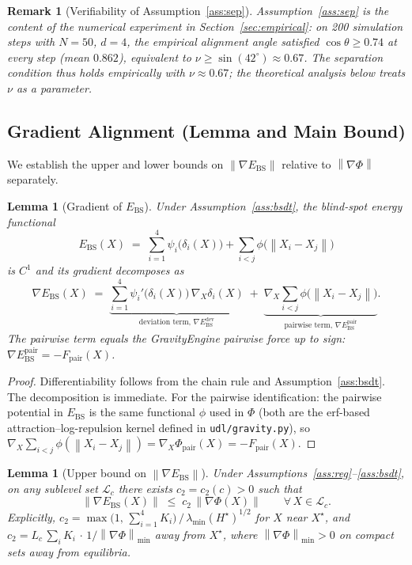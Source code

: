 \documentclass[11pt]{article}
\newtheorem{lemma}[theorem]{Lemma}
\newtheorem{remark}[theorem]{Remark}
\theoremstyle{definition}
\newcommand{\Xst}{X^{\star}}
\newcommand{\grad}{\nabla}
\newcommand{\Ebs}{E_{\mathrm{BS}}}
\newcommand{\lmin}{\lambda_{\min}}
\newcommand{\norm}[1]{\left\|#1\right\|}
\newcommand{\costheta}{\cos\theta}
\begin{document}
\begin{remark}[Verifiability of Assumption~\ref{ass:sep}]
\label{rem:verifiable}
Assumption~\ref{ass:sep} is the content of the numerical experiment in
Section~\ref{sec:empirical}: on 200 simulation steps with $N=50$, $d=4$,
the empirical alignment angle satisfied $\costheta \ge 0.74$ at every step
(mean $0.862$), equivalent to $\nu \ge \sin(42^\circ) \approx 0.67$.  The
separation condition thus holds empirically with $\nu \approx 0.67$;
the theoretical analysis below treats $\nu$ as a parameter.
\end{remark}

\subsection{Gradient Alignment (Lemma and Main Bound)}
\label{sec:equiv:gradient}

We establish the upper and lower bounds on $\norm{\grad\Ebs}$ relative to
$\norm{\grad\Phi}$ separately.

\begin{lemma}[Gradient of $\Ebs$]
\label{lem:grad_ebs}
Under Assumption~\ref{ass:bsdt}, the blind-spot energy functional
\[
  \Ebs(X) \;=\; \sum_{i=1}^{4}\psi_i\bigl(\delta_i(X)\bigr)
              + \sum_{i < j}\phi\bigl(\norm{X_i - X_j}\bigr)
\]
is $C^1$ and its gradient decomposes as
\[
  \grad\Ebs(X)
  \;=\;
  \underbrace{\sum_{i=1}^{4}\psi_i'\bigl(\delta_i(X)\bigr)\,\grad_X\delta_i(X)}%
             _{\text{deviation term, }\grad\Ebs^{\mathrm{dev}}}
  \;+\;
  \underbrace{\grad_X\sum_{i<j}\phi\bigl(\norm{X_i-X_j}\bigr)}%
             _{\text{pairwise term, }\grad\Ebs^{\mathrm{pair}}}.
\]
The pairwise term equals the GravityEngine pairwise force up to sign:
$\grad\Ebs^{\mathrm{pair}} = -F_{\mathrm{pair}}(X)$.
\end{lemma}

\begin{proof}
Differentiability follows from the chain rule and Assumption~\ref{ass:bsdt}.
The decomposition is immediate.  For the pairwise identification: the pairwise
potential in $\Ebs$ is the same functional $\phi$ used in $\Phi$ (both are
the erf-based attraction--log-repulsion kernel defined in
\texttt{udl/gravity.py}), so
$\grad_X\sum_{i<j}\phi(\norm{X_i-X_j}) = \grad_X\Phi_{\mathrm{pair}}(X)
= -F_{\mathrm{pair}}(X)$.
\end{proof}

\begin{lemma}[Upper bound on $\norm{\grad\Ebs}$]
\label{lem:upper}
Under Assumptions~\ref{ass:reg}--\ref{ass:bsdt}, on any sublevel set
$\mathcal{L}_c$ there exists $c_2 = c_2(c) > 0$ such that
\[
  \norm{\grad\Ebs(X)} \;\le\; c_2\,\norm{\grad\Phi(X)}
  \qquad \forall\, X \in \mathcal{L}_c.
\]
Explicitly, $c_2 = \max\bigl(1,\, \sum_{i=1}^4 K_i\bigr)\, /\, \lmin(H^\star)^{1/2}$
for $X$ near $\Xst$, and $c_2 = L_c\,\sum_i K_i\,\cdot\,1/\norm{\grad\Phi}_{\min}$
away from $\Xst$, where $\norm{\grad\Phi}_{\min} > 0$ on compact sets away from
equilibria.
\end{lemma}
\end{document}
